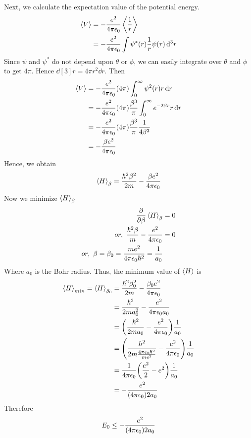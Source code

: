 		Next, we calculate the expectation value of the potential energy.
		\begin{align*}
			\expval{V} &= -\frac{e^2}{4\pi \epsilon_0} \expval{\frac{1}{r}}\\
			&= -\frac{e^2}{4\pi \epsilon_0} \int \psi^*\qty(r) \frac{1}{r} \psi\qty(r) \dd[3]{r}
		\end{align*}
		Since $\psi$ and $\psi^*$ do not depend upon $\theta$ or $\phi$, we can easily integrate over $\theta$ and $\phi$ to get $4\pi$. Hence $\dd[3]{r} = 4 \pi r^2 \dd{r}$. Then
		\begin{align*}
			\expval{V} 
			&= - \frac{e^2}{4 \pi \epsilon_0} \qty(4\pi) \int_{0}^{\infty} \psi^2\qty(r) r \dd{r}\\
			&= - \frac{e^2}{4 \pi \epsilon_0} \qty(4\pi) \frac{\beta^3}{\pi} \int_{0}^{\infty} e^{-2\beta r} r \dd{r}\\
			&= - \frac{e^2}{4 \pi \epsilon_0} \qty(4\pi) \frac{\beta^3}{\pi} \frac{1}{4\beta^2}\\
			&= - \frac{\beta e^2}{4 \pi \epsilon_0}
		\end{align*}
		Hence, we obtain
		\begin{align*}
			\expval{H}_\beta = \frac{\hbar^2 \beta^2}{2 m } - \frac{\beta e^2}{4\pi \epsilon_0}
		\end{align*}
		Now we minimize $\expval{H}_\beta$
		\begin{align*}
			\pdv{}{\beta} \expval{H}_\beta &= 0\\
			or, \ \frac{\hbar^2 \beta}{m} - \frac{e^2}{4\pi\epsilon_0} &= 0 \\
			or, \ \beta=\beta_0 = \frac{m e^2}{4\pi \epsilon_0 \hbar^2} = \frac{1}{a_0}
		\end{align*}
		Where $a_0$ is the Bohr radius. Thus, the minimum value of $\expval{H}$ is 
		\begin{align*}
			\expval{H}_{min} =  \expval{H}_{\beta_0} &= \frac{\hbar^2\beta_0^2}{2 m} - \frac{\beta_0 e^2}{4 \pi \epsilon_0}\\
			&= \frac{\hbar^2}{2 m a_0^2} - \frac{e^2}{4\pi \epsilon_0 a_0}\\
			&= \qty(\frac{\hbar^2}{2 m a_0}  -  \frac{e^2}{4\pi \epsilon_0}) \frac{1}{a_0} \\
			&= \qty(\frac{\hbar^2}{2 m \frac{4\pi \epsilon_0 \hbar^2}{m e^2}}  -  \frac{e^2}{4\pi \epsilon_0}) \frac{1}{a_0} \\
			&= \frac{1}{4\pi \epsilon_0} \qty(\frac{e^2}{2} - e^2) \frac{1}{a_0}\\
			&= - \frac{e^2}{\qty(4\pi \epsilon_0) 2 a_0}
		\end{align*}
		Therefore
		\begin{align*}
			E_0 \leq - \frac{e^2}{\qty(4\pi \epsilon_0) 2 a_0}
		\end{align*}
		
